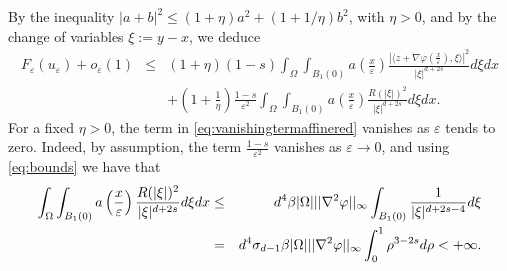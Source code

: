 \documentclass[11pt,a4paper,reqno]{amsart}
\theoremstyle{plain}
\theoremstyle{definition}
\newcommand\e{\varepsilon}
\newcommand\Om{\Omega}
\theoremstyle{remark}
\begin{document}
By the inequality $|a+b|^2 \leq (1+\eta)a^2+(1+1/\eta)b^2$, with $\eta>0$, and by the change of variables $\xi:=y-x$, we deduce
\begin{eqnarray} \label{eq:goodternaffinered}
F_\e(u_\e)+o_\e(1) &\leq & (1+\eta)(1-s)\int_\Omega \int_{B_1(0)} a\left(\frac{x}{\e}\right)\frac{|\langle z + \nabla\varphi \left(\frac{x}{\e}\right), \xi \rangle|^2}{|\xi|^{d+2s}} d\xi dx \\ \label{eq:vanishingtermaffinered}
& & +\left(1+\frac{1}{\eta}\right) \frac{1-s}{\e ^2}\int_\Omega \int_{B_1(0)} a\left(\frac{x}{\e}\right) \frac{ R(|\xi|)^2}{|\xi|^{d+2s}}d\xi dx.  
\end{eqnarray}
For a fixed $\eta>0$, the term in \eqref{eq:vanishingtermaffinered} vanishes as $\e$ tends to zero. Indeed, by assumption, the term $\frac{1-s}{\e^2}$ vanishes as $\e\to0$, and using \eqref{eq:bounds} we have that
 \begin{eqnarray}     \nonumber
\int_\Omega\int_{B_1(0)} a\left(\frac{x}{\e}\right) \frac{ R(|\xi|)^2}{|\xi|^{d+2s}}d\xi dx & \leq & d^4\beta|\Om|||\nabla^2\varphi||_{\rm \infty} \int_{B_1(0)} \frac{1}{|\xi|^{d+2s-4}}d\xi \\ \label{eq:integralesolito}
 & = & d^4\sigma_{d-1}\beta|\Om|||\nabla^2\varphi||_{\rm \infty}\int_0^1\rho^{3-2s}d\rho<+\infty.
 \end{eqnarray}
\end{document}
